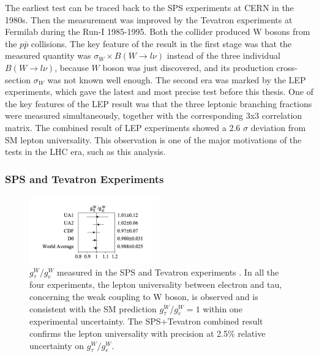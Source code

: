 The earliest test can be traced back to the SPS experiments at CERN in the 1980s. Then the measurement was improved by the Tevatron experiments at Fermilab during the Run-I 1985-1995. Both the collider produced W bosons from the $p\bar{p}$ collisions. The key feature of the result in the first stage was that the measured quantity was $\sigma_W \times B(W\to l\nu)$ instead of the three individual $B(W\to l\nu)$, because $W$ boson was just discovered, and its production cross-section $\sigma_W$ was not known well enough. The second era was marked by the LEP experiments, which gave the latest and most precise test before this thesis. One of the key features of the LEP result was that the three leptonic branching fractions were measured simultaneously, together with the corresponding 3x3 correlation matrix. The combined result of LEP experiments showed a 2.6 $\sigma$ deviation from SM lepton universality. This observation is one of the major motivations of the tests in the LHC era, such as this analysis.


\subsubsection{SPS and Tevatron Experiments}



\begin{figure}[ht]
    \centering
    \includegraphics[width=0.5\textwidth]{chapters/RelatedWorks/sectionLU/figures/spsTevatron.png}
    \caption{ $g^W_\tau / g^W_e$ measured in the SPS and Tevatron experiments \cite{Abbott:1999pk}. In all the four experiments, the lepton universality between electron and tau, concerning the weak coupling to W boson, is observed and is consistent with the SM prediction $g^W_\tau / g^W_e=1$ within one experimental uncertainty. The SPS+Tevatron combined result confirms the lepton universality with precision at 2.5\% relative uncertainty on $g^W_\tau / g^W_e$. }
    \label{fig:relatedWorks:lu:W:spsTevatronCombinedRatio}
\end{figure}

